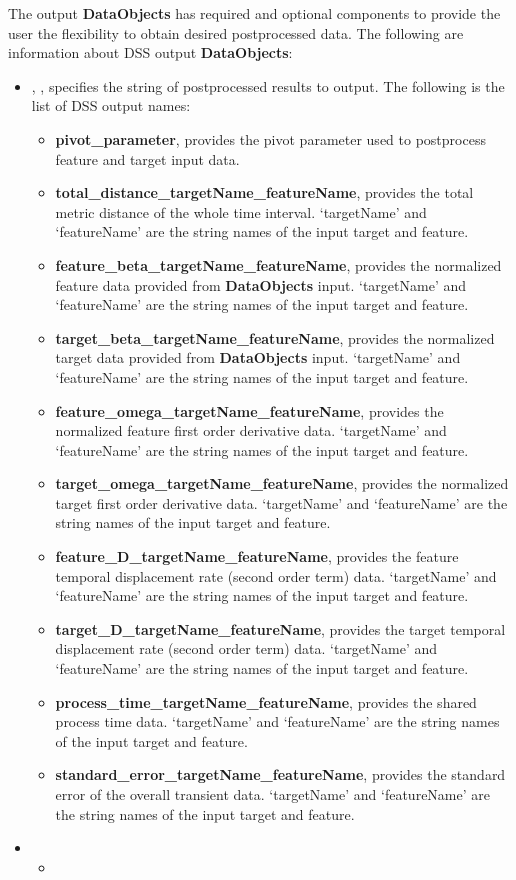 The output \textbf{DataObjects} has required and optional components to provide the user the flexibility to obtain desired postprocessed data. The following are information about DSS output \textbf{DataObjects}:
\begin{itemize}
  \item {}, , specifies the string of postprocessed results to output. The following is the list of DSS output names:
    \begin{itemize}
      \item \textbf{pivot_parameter}, provides the pivot parameter used to postprocess feature and target input data.
      \item \textbf{total_distance_targetName_featureName}, provides the total metric distance of the whole time interval. `targetName' and `featureName' are the string names of the input target and feature.
      \item \textbf{feature_beta_targetName_featureName}, provides the normalized feature data provided from \textbf{DataObjects} input.  `targetName' and `featureName' are the string names of the input target and feature.
      \item \textbf{target_beta_targetName_featureName}, provides the normalized target data provided from \textbf{DataObjects} input.  `targetName' and `featureName' are the string names of the input target and feature.
      \item \textbf{feature_omega_targetName_featureName}, provides the normalized feature first order derivative data.  `targetName' and `featureName' are the string names of the input target and feature.
      \item \textbf{target_omega_targetName_featureName}, provides the normalized target first order derivative data.  `targetName' and `featureName' are the string names of the input target and feature.
      \item \textbf{feature_D_targetName_featureName}, provides the feature temporal displacement rate (second order term) data.  `targetName' and `featureName' are the string names of the input target and feature.
      \item \textbf{target_D_targetName_featureName}, provides the target temporal displacement rate (second order term) data.  `targetName' and `featureName' are the string names of the input target and feature.
      \item \textbf{process_time_targetName_featureName}, provides the shared process time data.  `targetName' and `featureName' are the string names of the input target and feature.
      \item \textbf{standard_error_targetName_featureName}, provides the standard error of the overall transient data.  `targetName' and `featureName' are the string names of the input target and feature.
    \end{itemize}
  \item {}
  \begin{itemize}
    \item {}
  \end{itemize}
\end{itemize}
